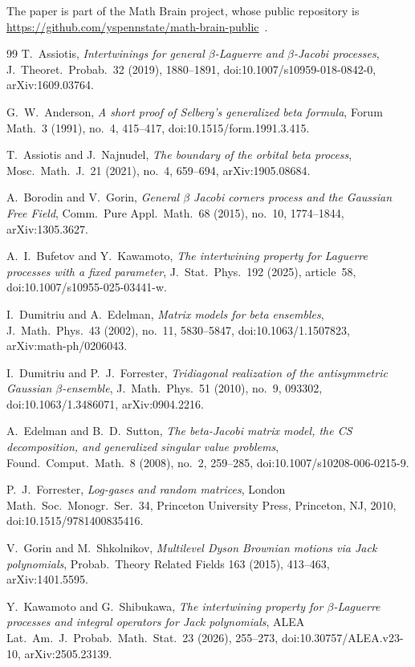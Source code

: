 \documentclass[10pt]{amsart}
\begin{document}
The paper is part of the Math Brain project, whose public repository is \url{https://github.com/yspennstate/math-brain-public}~\cite{MathBrainRepo}.

\begin{thebibliography}{99}
 T.~Assiotis, \emph{Intertwinings for general $\beta$-Laguerre and $\beta$-Jacobi processes}, J.\ Theoret.\ Probab.\ 32 (2019), 1880--1891, doi:10.1007/s10959-018-0842-0, arXiv:1609.03764.

 G.~W.~Anderson, \emph{A short proof of Selberg's generalized beta formula}, Forum Math.\ 3 (1991), no.~4, 415--417, doi:10.1515/form.1991.3.415.

 T.~Assiotis and J.~Najnudel, \emph{The boundary of the orbital beta process}, Mosc.\ Math.\ J.\ 21 (2021), no.~4, 659--694, arXiv:1905.08684.

 A.~Borodin and V.~Gorin, \emph{General $\beta$ Jacobi corners process and the Gaussian Free Field}, Comm.\ Pure Appl.\ Math.\ 68 (2015), no.~10, 1774--1844, arXiv:1305.3627.

 A.~I.~Bufetov and Y.~Kawamoto, \emph{The intertwining property for Laguerre processes with a fixed parameter}, J.\ Stat.\ Phys.\ 192 (2025), article~58, doi:10.1007/s10955-025-03441-w.

 I.~Dumitriu and A.~Edelman, \emph{Matrix models for beta ensembles}, J.\ Math.\ Phys.\ 43 (2002), no.~11, 5830--5847, doi:10.1063/1.1507823, arXiv:math-ph/0206043.

 I.~Dumitriu and P.~J.~Forrester, \emph{Tridiagonal realization of the antisymmetric Gaussian $\beta$-ensemble}, J.\ Math.\ Phys.\ 51 (2010), no.~9, 093302, doi:10.1063/1.3486071, arXiv:0904.2216.

 A.~Edelman and B.~D.~Sutton, \emph{The beta-Jacobi matrix model, the CS decomposition, and generalized singular value problems}, Found.\ Comput.\ Math.\ 8 (2008), no.~2, 259--285, doi:10.1007/s10208-006-0215-9.

 P.~J.~Forrester, \emph{Log-gases and random matrices}, London Math.\ Soc.\ Monogr.\ Ser.\ 34, Princeton University Press, Princeton, NJ, 2010, doi:10.1515/9781400835416.

 V.~Gorin and M.~Shkolnikov, \emph{Multilevel Dyson Brownian motions via Jack polynomials}, Probab.\ Theory Related Fields 163 (2015), 413--463, arXiv:1401.5595.

 Y.~Kawamoto and G.~Shibukawa, \emph{The intertwining property for $\beta$-Laguerre processes and integral operators for Jack polynomials}, ALEA Lat.\ Am.\ J.\ Probab.\ Math.\ Stat.\ 23 (2026), 255--273, doi:10.30757/ALEA.v23-10, arXiv:2505.23139.


\end{thebibliography}
\end{document}
